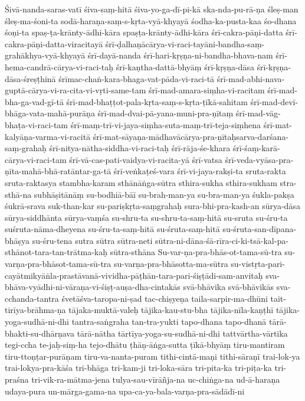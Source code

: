 {Śivā-nanda-saras-vatī
śiva-saṃ-hitā
śiva-yo-ga-dī-pi-kā
ska-nda-pu-rā-ṇa
śleṣ-man
śleṣ-ma-śoni-ta
sodā-haraṇa-saṃ-s-kṛta-vyā-khyayā
śodha-ka-pusta-kaa
śo-dhana
śoṇi-ta
spaṣ-ṭa-krānty-ādhi-kāra
spaṣṭa-krānty-ādhi-kāra
śrī-cakra-pāṇi-datta
śrī-cakra-pāṇi-datta-viracitayā
śrī-ḍalhaṇācārya-vi-raci-tayāni-bandha-saṃ-grahākhya-vyā-khyayā
śrī-dayā-nanda
śrī-hari-kṛṣṇa-ni-bandha-bhava-nam
śrī-hema-candrā-cārya-vi-raci-taḥ
śrī-kaṇtha-dattā-bhyāṃ
śrī-kṛṣṇa-dāsa
śrī-kṛṣṇa-dāsa-śreṣṭhinā
śrīmac-chaṅ-kara-bhaga-vat-pāda-vi-raci-tā
śrī-mad-abhi-nava-guptā-cārya-vi-ra-cita-vi-vṛti-same-tam
śrī-mad-amara-siṃha-vi-racitam
śrī-mad-bha-ga-vad-gī-tā
śrī-mad-bhaṭṭot-pala-kṛta-saṃ-s-kṛta-ṭīkā-sahitam
śrī-mad-devī-bhāga-vata-mahā-purāṇa
śrī-mad-dvai-pā-yana-muni-pra-ṇītaṃ
śrī-mad-vāg-bhaṭa-vi-raci-tam
śrī-maṃ-trī-vi-jaya-siṃha-suta-maṃ-trī-teja-siṃhena
śrī-mat-kalyāṇa-varma-vi-racitā
śrī-mat-sāyaṇa-mādhavācārya-pra-ṇītaḥsarva-darśana-saṃ-grahaḥ
śrī-nitya-nātha-siddha-vi-raci-taḥ
śrī-rāja-śe-khara
śrī-śaṃ-karā-cārya-vi-raci-tam
śrī-vā-cas-pati-vaidya-vi-racita-yā
śrī-vatsa
śrī-veda-vyāsa-pra-ṇīta-mahā-bhā-ratāntar-ga-tā
śrī-veṅkaṭeś-vara
śrī-vi-jaya-rakṣi-ta
sruta-rakta
sruta-raktasya
stambha-karam
sthānāṅga-sūtra
sthira-sukha
sthira-sukham
stra-sthā-na
subhāṣitānāṃ
su-bodhiā-bāī
su-brah-man-ya
su-bra-man-ya
śukla-pakṣa
śukrā-srava
suk-than-kar
su-pariṣkṛta-saṃgrahaḥ
sura-bhi-pra-kash-an
sūrya-dāsa
sūrya-siddhānta
sūrya-vaṃśa
su-shru-ta
su-shru-ta-saṃ-hitā
su-sruta
su-śru-ta
suśruta-nāma-dheyena
su-śru-ta-saṃ-hitā
su-śruta-saṃ-hitā
su-śruta-san-dīpana-bhāṣya
su-śru-tena
sutra
sūtra
sūtra-neti
sūtra-ni-dāna-śā-rīra-ci-ki-tsā-kal-pa-sthānot-tara-tan-trātma-kaḥ
sūtra-sthāna
Su-var-ṇa-pra-bhās-ot-tama-sū-tra
su-varṇa-pra-bhāsot-tama-sū-tra
su-varṇa-pra-bhāsotta-ma-sūtra
su-vistṛta-pari-cayātmikyāṅla-prastāvanā-vividha-pāṭhān-tara-pari-śiṣṭādi-sam-anvitaḥ
sva-bhāva-vyādhi-ni-vāraṇa-vi-śiṣṭ-auṣa-dha-cintakās
svā-bhāvika
svā-bhāvikās
sva-cchanda-tantra
śvetāśva-taropa-ni-ṣad
tac-chiṣyeṇa
taila-sarpir-ma-dhūni
tait-tirīya-brāhma-ṇa
tājaka-muktā-valeḥ
tājika-kau-stu-bha
tājika-nīla-kaṇṭhī
tājika-yoga-sudhā-ni-dhi
tantra-saṅgraha
tan-tra-yukti
tapo-dhana
tapo-dhanā
tārā-bhakti-su-dhārṇava
tārā-nātha
tārtīya-yoga-su-sudhā-ni-dhi
tattvārtha-vārtika
tegi-ccha
te-jaḥ-siṃ-ha
tejo-dhātu
ṭhāṇ-āṅga-sutta
ṭīkā-bhyāṃ
tiru-mantiram
tiru-ttoṇṭar-purāṇam
tiru-va-nanta-puram
tithi-cintā-maṇi
tithi-sāraṇī
trai-lok-ya
trai-lokya-pra-kāśa
tri-bhāga
tri-kam-ji
tri-loka-sāra
tri-pita-ka
tri-piṭa-ka
tri-praśna
tri-vik-ra-mātma-jena
tulya-sau-vīrāñja-na
uc-chiṅga-na
ud-ā-haraṇa
udaya-pura
un-mārga-gama-na
upa-ca-ya-bala-varṇa-pra-sādādī-ni
}
